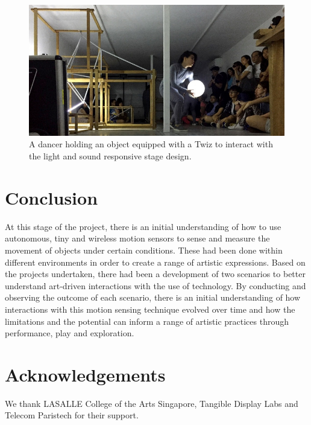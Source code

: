 \documentclass{sigchi}
\begin{document}
\begin{figure}[H]
\centering
\includegraphics[width=\columnwidth]{pics/performance}
\caption{A dancer holding an object equipped with a Twiz to
interact with the light and sound responsive stage design.}
\label{fig:performance}
\end{figure}

\section{Conclusion}

At this stage of the project, there is an initial
understanding of how to use autonomous, tiny and
wireless motion sensors to sense and measure the
movement of objects under certain conditions. These
had been done within different environments in order to
create a range of artistic expressions. Based on the
projects undertaken, there had been a development of
two scenarios to better understand art-driven
interactions with the use of technology.
By conducting and observing the outcome of each
scenario, there is an initial understanding of how
interactions with this motion sensing technique evolved
over time and how the limitations and the potential can
inform a range of artistic practices through
performance, play and exploration.

\section{Acknowledgements}

We thank LASALLE College of the Arts Singapore, Tangible
Display Labs and Telecom Paristech for their support.

\balance



\end{document}
